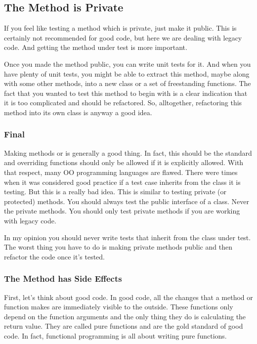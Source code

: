 \subsection{The Method is Private}

If you feel like testing a method which is private, just make it public. This is certainly not recommended for good code, but here we are dealing with legacy code. And getting the method under test is more important.

Once you made the method public, you can write unit tests for it. And when you have plenty of unit tests, you might be able to extract this method, maybe along with some other methods, into a new class or a set of freestanding functions. The fact that you wanted to test this method to begin with is a clear indication that it is too complicated and should be refactored. So, alltogether, refactoring this method into its own class is anyway a good idea.

\subsubsection*{Final}

Making methods  or  is generally a good thing. In fact, this should be the standard and overriding functions should only be allowed if it is explicitly allowed. With that respect, many OO programming languages are flawed. There were times when it was considered good practice if a test case inherits from the class it is testing. But this is a really bad idea. This is similar to testing private (or protected) methods. You should always test the public interface of a class. Never the private methods. You should only test private methods if you are working with legacy code.

In my opinion you should never write tests that inherit from the class under test. The worst thing you have to do is making private methods public and then refactor the code once it's tested.

\subsubsection*{The Method has Side Effects}

First, let's think about good code. In good code, all the changes that a method or function makes are immediately visible to the outside. These functions only depend on the function arguments and the only thing they do is calculating the return value. They are called pure functions and are the gold standard of good code. In fact, functional programming is all about writing pure functions.

